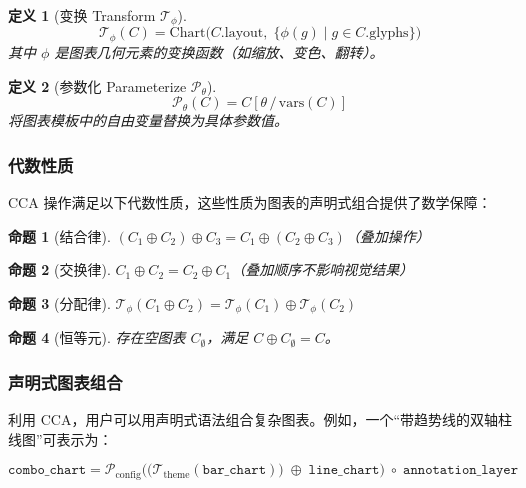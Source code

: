 \documentclass[12pt,a4paper]{ctexart}
\newtheorem{definition}{定义}[section]
\newtheorem{proposition}{命题}[section]
\theoremstyle{remark}
\begin{document}
\begin{definition}[变换 Transform $\mathcal{T}_\phi$]
    \begin{equation}
        \mathcal{T}_\phi(C) = \text{Chart}\big(
            C.\text{layout},\;
            \{ \phi(g) \mid g \in C.\text{glyphs} \}
        \big)
    \end{equation}
其中 $\phi$ 是图表几何元素的变换函数（如缩放、变色、翻转）。
\end{definition}

\begin{definition}[参数化 Parameterize $\mathcal{P}_\theta$]
    \begin{equation}
        \mathcal{P}_\theta(C) = C[\theta \,/\, \text{vars}(C)]
    \end{equation}
将图表模板中的自由变量替换为具体参数值。
\end{definition}

\subsubsection{代数性质}

CCA 操作满足以下代数性质，这些性质为图表的声明式组合提供了数学保障：

\begin{proposition}[结合律]
$(C_1 \oplus C_2) \oplus C_3 = C_1 \oplus (C_2 \oplus C_3)$（叠加操作）
\end{proposition}

\begin{proposition}[交换律]
$C_1 \oplus C_2 = C_2 \oplus C_1$（叠加顺序不影响视觉结果）
\end{proposition}

\begin{proposition}[分配律]
$\mathcal{T}_\phi(C_1 \oplus C_2) = \mathcal{T}_\phi(C_1) \oplus \mathcal{T}_\phi(C_2)$
\end{proposition}

\begin{proposition}[恒等元]
存在空图表 $C_\emptyset$，满足 $C \oplus C_\emptyset = C$。
\end{proposition}

\subsubsection{声明式图表组合}

利用 CCA，用户可以用声明式语法组合复杂图表。例如，一个“带趋势线的双轴柱线图”可表示为：

\begin{equation}
    \texttt{combo\_chart} =
    \mathcal{P}_{\text{config}}\Big(
        \big(\mathcal{T}_{\text{theme}}(\texttt{bar\_chart})\big) \;\oplus\; \texttt{line\_chart}
    \Big) \;\circ\; \texttt{annotation\_layer}
\end{equation}
\end{document}
